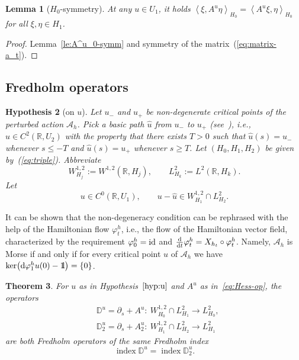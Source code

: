 \documentclass[pdftex]{sigma}
\numberwithin{equation}{section}
\newtheorem{Theorem}{Theorem}[section]
\newtheorem{Lemma}[Theorem]{Lemma}
\newtheorem{Hypothesis}[Theorem]{Hypothesis}
\newcommand{\D}{{\mathbb{D}}}
\newcommand{\R}{{\mathbb{R}}}
\newcommand{\Aa}{{\mathcal{A}}} %
\newcommand{\id}{{\rm id}} %
\newcommand{\INDEX}{\mathop{\mathrm{index}}} %
\newcommand{\INNER}[2]{\left\langle #1, #2\right\rangle}
\newcommand{\p}{{\partial}}
\newcommand{\1}{{{\mathchoice {\rm 1\mskip-4mu l} {\rm 1\mskip-4mu l}
{\rm 1\mskip-4.5mu l} {\rm 1\mskip-5mu l}}}}
\begin{document}
\begin{Lemma}[$H_0$-symmetry]\label{le:a^u-symm}
At any $u\in U_1$, it holds
$\INNER{\xi}{A^u\eta}_{H_0}=\INNER{A^u\xi}{\eta}_{H_0}$
for all $\xi,\eta\in H_1$.
\end{Lemma}

\begin{proof}
Lemma~\ref{le:A^u_0-symm} and symmetry of the matrix~(\ref{eq:matrix-a_t}).
\end{proof}

\subsection{Fredholm operators}

\begin{Hypothesis}[on $u$]\label{hyp:u}
Let $u_-$ and $u_+$ be non-degenerate critical points of the
perturbed action $\Aa_h$.
Pick a \textit{basic path} $\hat u$ from $u_-$ to $u_+$
(see~\cite{Frauenfelder:2025e}),
i.e., $\hat u\in C^2(\R,U_2)$ with the property that there exists $T>0$
such that $\hat u(s)=u_-$ whenever $s\le -T$ and
$\hat u(s)=u_+$ whenever $s\ge T$.
%
Let $(H_0,H_1,H_2)$ be given by~(\ref{eq:triple}). Abbreviate
\begin{equation}\label{eq:abbreviate}
 W^{1,2}_{H_j}:=W^{1,2}(\R,H_j)
 ,\qquad
 L^2_{H_k}:=L^2(\R,H_k) .
\end{equation}
Let
\[
 u\in C^0(\R,U_1)
 ,\qquad
 u-\hat u\in W^{1,2}_{H_1}\cap L^2_{H_2} .
\]
\end{Hypothesis}

It can be shown that the non-degeneracy condition can be rephrased with the
help of the Hamiltonian flow $\varphi_t^h$, i.e., the flow of the
Hamiltonian vector field,
characterized by the requirement $\varphi_0^h=\id$ and
$\tfrac{{\rm d}}{{\rm d}t}\varphi_t^h=X_{h_t}\circ \varphi_t^h$.
Namely, $\Aa_h$ is Morse if and only if for every critical point $u$ of $\Aa_h$
we have $\ker \bigl({\rm d}\varphi_1^h u(0)-\1\bigr)=\{0\}$.

\begin{Theorem}\label{thm:para-Darboux}
For $u$ as in Hypothesis~$\ref{hyp:u}$
and $A^u$ as in~\eqref{eq:Hess-op}, the operators
\begin{equation*}%
\begin{split}
 &\D^u
 =\p_s+A^u\colon\
 W^{1,2}_{H_0}\cap L^2_{H_1}
 \to L^2_{H_0},
\\
 &\D^u_2
 =\p_s+A^u_2\colon\
 W^{1,2}_{H_1}\cap L^2_{H_2}
 \to L^2_{H_1}
\end{split}
\end{equation*}
are both Fredholm operators of the same Fredholm index
\[
 \INDEX \D^u=\INDEX \D^u_2.
\]
\end{Theorem}
\end{document}
